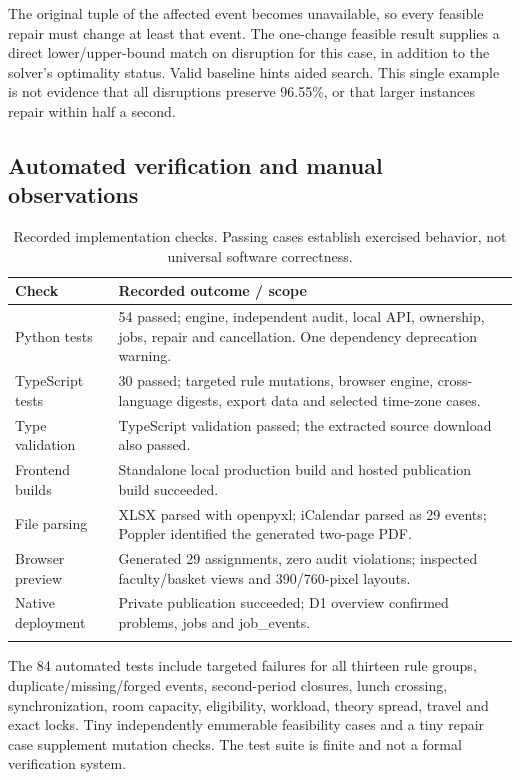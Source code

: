 \documentclass[pdflatex,sn-mathphys-num]{sn-jnl}
\theoremstyle{thmstyleone}
\theoremstyle{thmstyletwo}
\theoremstyle{thmstylethree}
\begin{document}
The original tuple of the affected event becomes unavailable, so every feasible repair must change at least that event. The one-change feasible result supplies a direct lower/upper-bound match on disruption for this case, in addition to the solver's optimality status. Valid baseline hints aided search. This single example is not evidence that all disruptions preserve 96.55\%, or that larger instances repair within half a second.

\subsection{Automated verification and manual observations}

\begin{table}[ht]
\caption{Recorded implementation checks. Passing cases establish exercised behavior, not universal software correctness.}\label{tab:validation}
\small
\begin{tabularx}{\textwidth}{@{}lX@{}}
\toprule
Check & Recorded outcome / scope \\
\midrule
Python tests & 54 passed; engine, independent audit, local API, ownership, jobs, repair and cancellation. One dependency deprecation warning. \\
TypeScript tests & 30 passed; targeted rule mutations, browser engine, cross-language digests, export data and selected time-zone cases. \\
Type validation & TypeScript validation passed; the extracted source download also passed. \\
Frontend builds & Standalone local production build and hosted publication build succeeded. \\
File parsing & XLSX parsed with openpyxl; iCalendar parsed as 29 events; Poppler identified the generated two-page PDF. \\
Browser preview & Generated 29 assignments, zero audit violations; inspected faculty/basket views and 390/760-pixel layouts. \\
Native deployment & Private publication succeeded; D1 overview confirmed problems, jobs and job\_events. \\
\botrule
\end{tabularx}
\end{table}

The 84 automated tests include targeted failures for all thirteen rule groups, duplicate/missing/forged events, second-period closures, lunch crossing, synchronization, room capacity, eligibility, workload, theory spread, travel and exact locks. Tiny independently enumerable feasibility cases and a tiny repair case supplement mutation checks. The test suite is finite and not a formal verification system.
\end{document}
